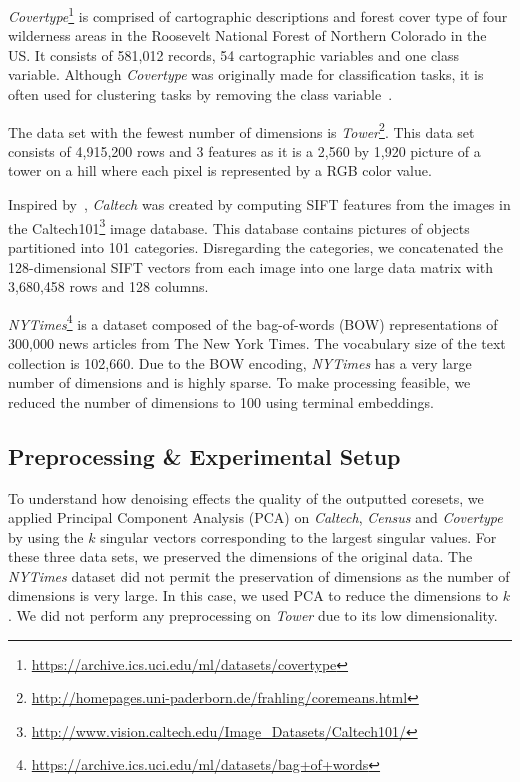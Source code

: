 \textit{Covertype}\footnote{\url{https://archive.ics.uci.edu/ml/datasets/covertype}} is comprised of cartographic descriptions and forest cover type of four wilderness areas in the Roosevelt National Forest of Northern Colorado in the US. It consists of 581,012 records, 54 cartographic variables and one class variable. Although \textit{Covertype} was originally made for classification tasks, it is often used for clustering tasks by removing the class variable~\cite{AckermannMRSLS12}.

The data set with the fewest number of dimensions is \textit{Tower}\footnote{\url{http://homepages.uni-paderborn.de/frahling/coremeans.html}}. This data set consists of 4,915,200 rows and 3 features as it is a 2,560 by 1,920 picture of a tower on a hill where each pixel is represented by a RGB color value. 



Inspired by~\cite{FGSSS13}, \textit{Caltech} was created by computing SIFT features from the images in the Caltech101\footnote{\url{http://www.vision.caltech.edu/Image_Datasets/Caltech101/}} image database. This database contains pictures of objects partitioned into 101 categories. Disregarding the categories, we concatenated the 128-dimensional SIFT vectors from each image into one large data matrix with 3,680,458 rows and 128 columns. 

\textit{NYTimes}\footnote{\url{https://archive.ics.uci.edu/ml/datasets/bag+of+words}} is a dataset composed of the bag-of-words (BOW) representations of 300,000 news articles from The New York Times. The vocabulary size of the text collection is 102,660. Due to the BOW encoding, \textit{NYTimes} has a very large number of dimensions and is highly sparse. To make processing feasible, we reduced the number of dimensions to 100 using terminal embeddings.

\subsection{Preprocessing \& Experimental Setup}
To understand how denoising effects the quality of the outputted coresets, we applied Principal Component Analysis (PCA) on \textit{Caltech}, \textit{Census} and \textit{Covertype} by using the $k$ singular vectors corresponding to the largest singular values. For these three data sets, we preserved the dimensions of the original data.  
The \textit{NYTimes} dataset did not permit the preservation of dimensions as the number of dimensions is very large. In this case, we used PCA to reduce the dimensions to $k$.
We did not perform any preprocessing on \textit{Tower} due to its low dimensionality.


